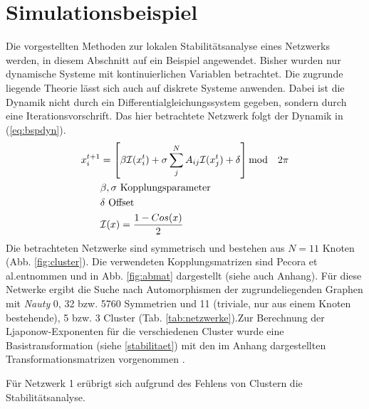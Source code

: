\section{Simulationsbeispiel}
Die vorgestellten Methoden zur lokalen Stabilitätsanalyse eines Netzwerks werden, in diesem Abschnitt auf ein Beispiel angewendet. Bisher wurden nur dynamische Systeme mit kontinuierlichen Variablen betrachtet. Die zugrunde liegende Theorie lässt sich auch auf diskrete Systeme anwenden. Dabei ist die Dynamik nicht durch ein Differentialgleichungssystem gegeben, sondern durch eine Iterationsvorschrift. Das hier betrachtete Netzwerk  folgt der Dynamik in (\ref{eq:bspdyn})\cite{pecora2014}.
\begin{align}
\label{eq:bspdyn}
	x_i^{t+1}&=\left[\beta\mathcal{I}(x_i^t)+\sigma \sum_j^N A_{ij}\mathcal{I}(x_j^t)+\delta\right] \text{mod}\quad 2\pi
	\\\notag & \beta,\sigma \text{ Kopplungsparameter}
	\\\notag  & \delta \text{ Offset}
	\\\notag &\mathcal{I}(x)=\frac{1-Cos(x)}{2}
\end{align}
Die betrachteten Netzwerke sind symmetrisch und bestehen aus $N=11$ Knoten  (Abb. \ref{fig:cluster}). Die verwendeten Kopplungsmatrizen sind Pecora et al.entnommen und in Abb. \ref{fig:abmat} dargestellt (siehe auch Anhang)\cite{pecora2014}. Für diese Netwerke ergibt die Suche nach Automorphismen der zugrundeliegenden Graphen mit \textit{Nauty} 0, 32 bzw. 5760 Symmetrien und 11 (triviale, nur aus einem Knoten bestehende), 5 bzw. 3 Cluster (Tab. \ref{tab:netzwerke}).Zur Berechnung der Ljaponow-Exponenten für die verschiedenen Cluster wurde eine Basistransformation (siehe \ref{stabilitaet}) mit den im Anhang dargestellten Transformationsmatrizen vorgenommen \cite{pecora2014,sagenotebook}.

Für Netzwerk 1 erübrigt sich aufgrund des Fehlens von Clustern die Stabilitätsanalyse.\\


